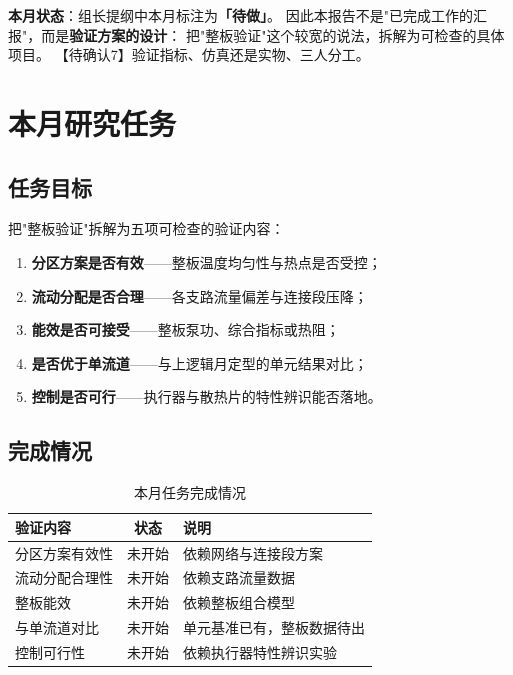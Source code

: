 \documentclass[stage2,fontset=fandol]{ydzjreport}
\begin{document}
\makestagetwohead

\begin{notebox}
\textbf{本月状态}：组长提纲中本月标注为\textbf{「待做」}。
因此本报告不是"已完成工作的汇报"，而是\textbf{验证方案的设计}：
把"整板验证"这个较宽的说法，拆解为可检查的具体项目。
【待确认7】验证指标、仿真还是实物、三人分工。
\end{notebox}

\section{本月研究任务}

\subsection{任务目标}

把"整板验证"拆解为五项可检查的验证内容：

\begin{enumerate}
  \item \textbf{分区方案是否有效}——整板温度均匀性与热点是否受控；
  \item \textbf{流动分配是否合理}——各支路流量偏差与连接段压降；
  \item \textbf{能效是否可接受}——整板泵功、综合指标或热阻；
  \item \textbf{是否优于单流道}——与上逻辑月定型的单元结果对比；
  \item \textbf{控制是否可行}——执行器与散热片的特性辨识能否落地。
\end{enumerate}

\subsection{完成情况}

\begin{table}[H]
\centering
\caption{本月任务完成情况}
\label{tab:tasks}
\begin{tabularx}{\textwidth}{@{}Y c Y@{}}
\toprule
{} 验证内容 & 状态 & 说明 \\
\midrule
分区方案有效性 & 未开始 & 依赖网络与连接段方案 \\
流动分配合理性 & 未开始 & 依赖支路流量数据 \\
整板能效 & 未开始 & 依赖整板组合模型 \\
与单流道对比 & 未开始 & 单元基准已有，整板数据待出 \\
控制可行性 & 未开始 & 依赖执行器特性辨识实验 \\
\bottomrule
\end{tabularx}
\end{table}
\end{document}
